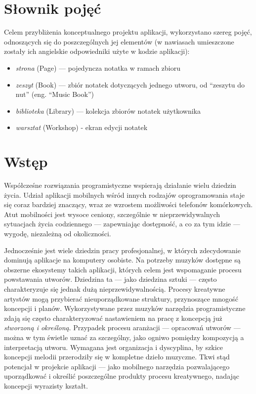 \documentclass[12pt]{article}
\begin{document}
\newpage
\clearpage
\tableofcontents

\newpage
{}
\section*{Słownik pojęć}
Celem przybliżenia konceptualnego projektu aplikacji, wykorzystano szereg pojęć, odnoszących się do poszczególnych jej
elementów (w nawiasach umieszczone zostały ich angielskie odpowiedniki użyte w kodzie aplikacji):
\begin{itemize}
	\item \textit{strona} (Page) — pojedyncza notatka w ramach zbioru
	\item \textit{zeszyt} (Book) — zbiór notatek dotyczących jednego utworu, od \enquote{zeszytu do nut} (eng. \enquote{Music Book})
	\item \textit{biblioteka} (Library) — kolekcja zbiorów notatek użytkownika
	\item \textit{warsztat} (Workshop) - ekran edycji notatek
\end{itemize}

\newpage
{}
\section*{Wstęp}
Współcześne rozwiązania programistyczne wspierają działanie wielu dziedzin życia.
Udział aplikacji mobilnych wśród innych rodzajów oprogramowania staje się coraz bardziej znaczący,
wraz ze wzrostem możliwości telefonów komórkowych.
Atut mobilności jest wysoce ceniony, szczególnie w nieprzewidywalnych sytuacjach życia codziennego
— zapewniając dostępność, a co za tym idzie — wygodę, niezależną od okoliczności.

Jednocześnie jest wiele dziedzin pracy profesjonalnej, w których zdecydowanie dominują aplikacje na komputery osobiste.
Na potrzeby muzyków dostępne są obszerne ekosystemy takich aplikacji, których celem jest wspomaganie procesu powstawania utworów.
Dziedzina ta — jako dziedzina sztuki — często charakteryzuje się jednak dużą nieprzewidywalnością.
Procesy kreatywne artystów mogą przybierać nieuporządkowane struktury, przynoszące mnogość koncepcji i planów.
Wykorzystywane przez muzyków narzędzia programistyczne zdają się często charakteryzować nastawieniem na pracę
z koncepcją już \textit{stworzoną i określoną}.
Przypadek procesu aranżacji — opracowań utworów — można w tym świetle uznać za szczególny, jako ogniwo pomiędzy kompozycją
a interpretacją utworu. Wymagana jest organizacja i dyscyplina, by szkice koncepcji melodii przerodziły się w kompletne
dzieło muzyczne. Tkwi stąd potencjał w projekcie aplikacji — jako mobilnego narzędzia pozwalającego uporządkować i określić
poszczególne produkty procesu kreatywnego, nadając koncepcji wyrazisty kształt.
\end{document}
